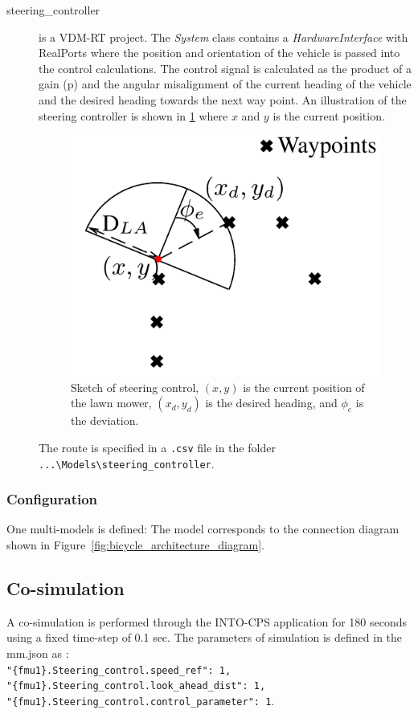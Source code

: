 \begin{description}
	\item[steering\_controller] is a VDM-RT project. The \textit{System} class contains a \textit{HardwareInterface} with RealPorts where the position and orientation of the vehicle is passed into the control calculations. 
	The control signal is calculated as the product of a gain (p) and the angular misalignment of the current heading of the vehicle and the desired heading towards the next way point. 
	An illustration of the steering controller is shown in \ref{fig:controller} where $x$ and $y$ is the current position.
	\begin{figure}[htbp]
		\begin{center}
			\includegraphics[width = 0.4\linewidth]{vehicle/controller_sketch.png}
			\caption{Sketch of steering control, $ \left(x,y\right) $ is the current position of the lawn mower, $ \left(x_d,y_d\right)$ is the desired heading, and $\phi_e$ is the deviation.}
			\label{fig:controller}
		\end{center}
	\end{figure}
	The route is specified in a \texttt{.csv} file in the folder \texttt{...\textbackslash Models\textbackslash steering\_controller}.
\end{description}




\subsubsection{Configuration}
\label{sec:bicyclemodel_conf}
One multi-models is defined: The model corresponds to the connection diagram shown in Figure~\ref{fig:bicycle_architecture_diagram}. 


\subsection{Co-simulation}
A co-simulation is performed through the INTO-CPS application for 180 seconds using a fixed time-step of 0.1 sec. 
The parameters of simulation is defined in the mm.json as : \\
\texttt{"\{fmu1\}.Steering\_control.speed\_ref": 1,} \\
\texttt{"\{fmu1\}.Steering\_control.look\_ahead\_dist": 1,} \\
\texttt{"\{fmu1\}.Steering\_control.control\_parameter": 1}. \\

